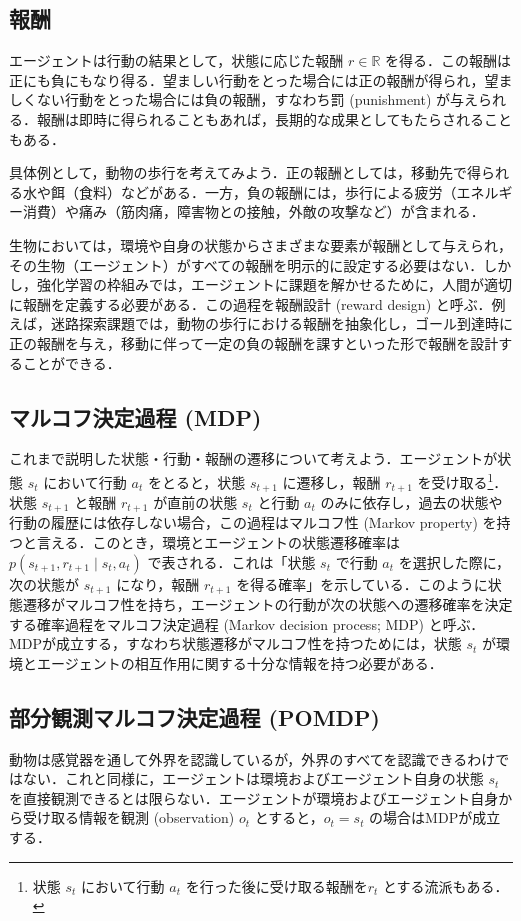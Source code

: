 \documentclass[titlepage]{ltjsbook}
\begin{document}
\subsection{報酬}
エージェントは行動の結果として，状態に応じた報酬 $r \in \mathbb{R}$ を得る．この報酬は正にも負にもなり得る．望ましい行動をとった場合には正の報酬が得られ，望ましくない行動をとった場合には負の報酬，すなわち罰 (punishment) が与えられる．報酬は即時に得られることもあれば，長期的な成果としてもたらされることもある．

具体例として，動物の歩行を考えてみよう．正の報酬としては，移動先で得られる水や餌（食料）などがある．一方，負の報酬には，歩行による疲労（エネルギー消費）や痛み（筋肉痛，障害物との接触，外敵の攻撃など）が含まれる．

生物においては，環境や自身の状態からさまざまな要素が報酬として与えられ，その生物（エージェント）がすべての報酬を明示的に設定する必要はない．しかし，強化学習の枠組みでは，エージェントに課題を解かせるために，人間が適切に報酬を定義する必要がある．この過程を報酬設計 (reward design) と呼ぶ．例えば，迷路探索課題では，動物の歩行における報酬を抽象化し，ゴール到達時に正の報酬を与え，移動に伴って一定の負の報酬を課すといった形で報酬を設計することができる．

\subsection{マルコフ決定過程 (MDP)}
これまで説明した状態・行動・報酬の遷移について考えよう．エージェントが状態 $s_t$ において行動 $a_t$ をとると，状態 $s_{t+1}$ に遷移し，報酬 $r_{t+1}$ を受け取る\footnote{状態 $s_t$ において行動 $a_t$ を行った後に受け取る報酬を$r_t$ とする流派もある．}．状態 $s_{t+1}$ と報酬 $r_{t+1}$ が直前の状態 $s_t$ と行動 $a_t$ のみに依存し，過去の状態や行動の履歴には依存しない場合，この過程はマルコフ性 (Markov property) を持つと言える．このとき，環境とエージェントの状態遷移確率は $p(s_{t+1}, r_{t+1} \mid s_t, a_t)$ で表される．これは「状態 $s_t$ で行動 $a_t$ を選択した際に，次の状態が $s_{t+1}$ になり，報酬 $r_{t+1}$ を得る確率」を示している．このように状態遷移がマルコフ性を持ち，エージェントの行動が次の状態への遷移確率を決定する確率過程をマルコフ決定過程 (Markov decision process; MDP) と呼ぶ．MDPが成立する，すなわち状態遷移がマルコフ性を持つためには，状態 $s_t$ が環境とエージェントの相互作用に関する十分な情報を持つ必要がある．

\subsection{部分観測マルコフ決定過程 (POMDP)}
動物は感覚器を通して外界を認識しているが，外界のすべてを認識できるわけではない．これと同様に，エージェントは環境およびエージェント自身の状態 $s_t$ を直接観測できるとは限らない．エージェントが環境およびエージェント自身から受け取る情報を観測 (observation) $o_t$ とすると，$o_t = s_t$ の場合はMDPが成立する．
\end{document}
